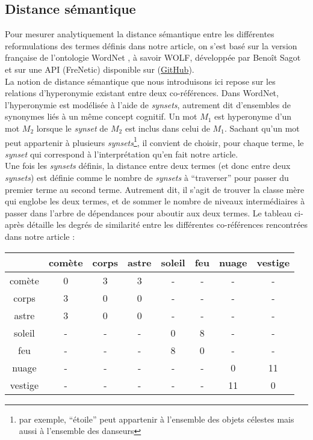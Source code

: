 \documentclass[a4paper,10pt]{article}
\begin{document}
	\subsection{Distance sémantique}
		Pour mesurer analytiquement la distance sémantique entre les différentes reformulations des termes définis dans notre article, on s'est basé sur la version française de l'ontologie WordNet \cite{WordNet1998}, à savoir WOLF, développée par Benoît Sagot \cite{Sagot2008} et sur une API (FreNetic) disponible sur (\href{https://github.com/hardik-vala/FreNetic}{GitHub}).\\
		La notion de distance sémantique que nous introduisons ici repose sur les relations d'hyperonymie existant entre deux co-références. Dans WordNet, l'hyperonymie est modélisée à l'aide de  \textit{synsets}, autrement dit d'ensembles de synonymes liés à un même concept cognitif. Un mot $M_1$ est hyperonyme d'un mot $M_2$ lorsque le \textit{synset} de $M_2$ est inclus dans celui de $M_1$. Sachant qu'un mot peut appartenir à plusieurs \textit{synsets}\footnote{par exemple, ``étoile'' peut appartenir à l'ensemble des objets célestes mais aussi à l'ensemble des danseurs}, il convient de choisir, pour chaque terme, le \textit{synset} qui correspond à l'interprétation qu'en fait notre article.\\
		Une fois les \textit{synsets} définis, la distance entre deux termes (et donc entre deux \textit{synsets}) est définie comme le nombre de \textit{synsets} à ``traverser'' pour passer du premier terme au second terme. Autrement dit, il s'agit de trouver la classe mère qui englobe les deux termes, et de sommer le nombre de niveaux intermédiaires à passer dans l'arbre de dépendances pour aboutir aux deux termes. Le tableau ci-après détaille les degrés de similarité entre les différentes co-références rencontrées dans notre article :
		\begin{center}
			\begin{tabular}{| c || c c c c c c c |}
				\hline
				& comète & corps & astre & soleil & feu & nuage & vestige\\
				\hline
				comète & 0 & 3 & 3 & - & - & - & -\\
				corps & 3 & 0 & 0 & - & - & - & -\\
				astre & 3 & 0 & 0 & - & - & - & -\\
				soleil & - & - & - & 0 & 8 & - & -\\
				feu & - & - & - & 8 & 0 & - & -\\
				nuage & - & - & - & - & - & 0 & 11\\
				vestige & - & - & - & - & - & 11 & 0\\
				\hline
			\end{tabular}
		\end{center}
\end{document}
